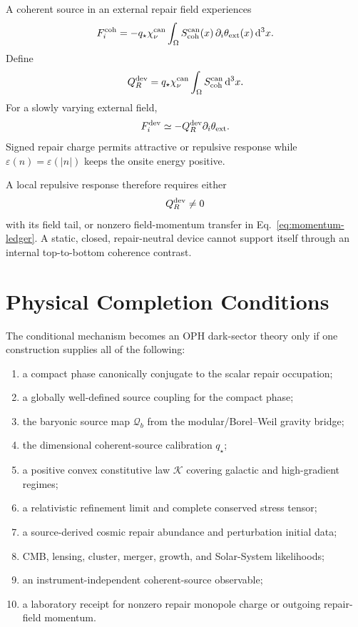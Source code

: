 \documentclass[11pt]{article}
\newcommand{\chican}{\chi_\nu^{\mathrm{can}}}
\newcommand{\dd}{\,\mathrm d}
\begin{document}
A coherent source in an external repair field experiences
\begin{equation}
F_i^{\rm coh}=-q_\star\chican
\int_\Omega S_{\rm coh}^{\rm can}(x)
\,\partial_i\theta_{\rm ext}(x)\dd^3x.
\label{eq:coherent-force}
\end{equation}
Define
\begin{equation}
Q_R^{\rm dev}=q_\star\chican
\int_\Omega S_{\rm coh}^{\rm can}\dd^3x.
\end{equation}
For a slowly varying external field,
\begin{equation}
F_i^{\rm dev}\simeq-Q_R^{\rm dev}\partial_i\theta_{\rm ext}.
\label{eq:device-force}
\end{equation}
Signed repair charge permits attractive or repulsive response while
\(\varepsilon(n)=\varepsilon(|n|)\) keeps the onsite energy positive.

A local repulsive response therefore requires either
\begin{equation}
Q_R^{\rm dev}\ne0
\end{equation}
with its field tail, or nonzero field-momentum transfer in
Eq.~\eqref{eq:momentum-ledger}. A static, closed, repair-neutral device cannot
support itself through an internal top-to-bottom coherence contrast.

\section{Physical Completion Conditions}

The conditional mechanism becomes an OPH dark-sector theory only if one
construction supplies all of the following:
\begin{enumerate}
\item a compact phase canonically conjugate to the scalar repair occupation;
\item a globally well-defined source coupling for the compact phase;
\item the baryonic source map \(\mathcal Q_b\) from the modular/Borel--Weil
gravity bridge;
\item the dimensional coherent-source calibration \(q_\star\);
\item a positive convex constitutive law \(\mathcal K\) covering galactic and
high-gradient regimes;
\item a relativistic refinement limit and complete conserved stress tensor;
\item a source-derived cosmic repair abundance and perturbation initial data;
\item CMB, lensing, cluster, merger, growth, and Solar-System likelihoods;
\item an instrument-independent coherent-source observable;
\item a laboratory receipt for nonzero repair monopole charge or outgoing
repair-field momentum.
\end{enumerate}
\end{document}
